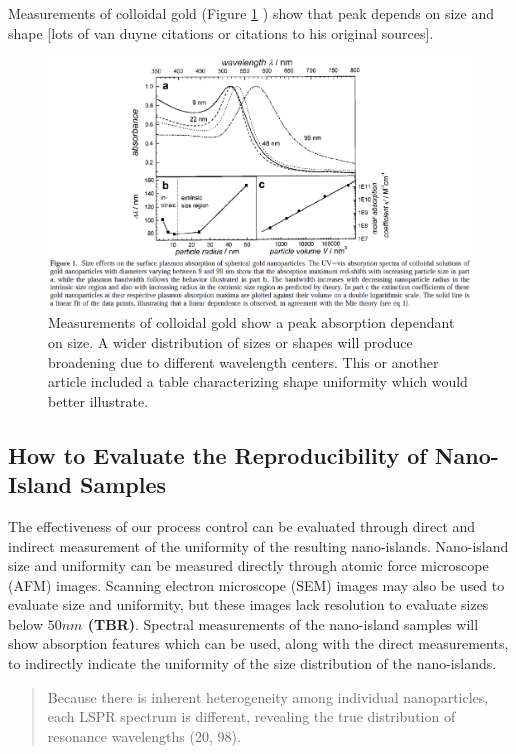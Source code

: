 \documentclass[12pt,oneside,english]{article}
\begin{document}
	Measurements of colloidal gold (Figure \ref{f:link99} \cite{link99}) show that peak depends on size and shape [lots of van duyne citations or citations to his original sources].
	
	\begin{figure}
		\includegraphics[width=150mm]{images/link99.eps}
		\caption{Measurements of colloidal gold show a peak absorption dependant on size.  A wider distribution of sizes or shapes will produce broadening due to different wavelength centers.  This or another article included a table characterizing shape uniformity which would better illustrate.}
		\label{f:link99}
	\end{figure}
		

	\subsection{How to Evaluate the Reproducibility of Nano-Island Samples}
	The effectiveness of our process control can be evaluated through direct and indirect measurement of the uniformity of the resulting nano-islands.  
	Nano-island size and uniformity can be measured directly through atomic force microscope (AFM) images.  
	Scanning electron microscope (SEM) images may also be used to evaluate size and uniformity, but these images lack resolution to evaluate sizes below {\bf $50nm$ (TBR)}.  
	Spectral measurements of the nano-island samples will show absorption features which can be used, along with the direct measurements, to indirectly indicate the uniformity of the size distribution of the nano-islands.
	
	\begin{quote}
		Because there is inherent heterogeneity among individual nanoparticles, each LSPR spectrum is different, revealing the true distribution of resonance wavelengths (20, 98).		
		\cite{willets2006}
	\end{quote}
	
\end{document}
